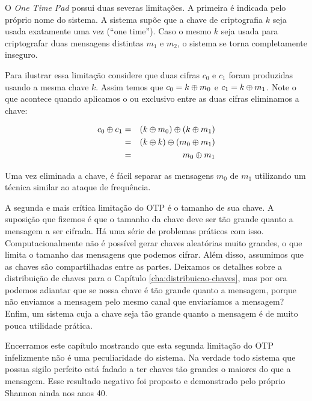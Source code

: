 O {\em One Time Pad} possui duas severas limitações.
A primeira é indicada pelo próprio nome do sistema.
A sistema supõe que a chave de criptografia $k$ seja usada exatamente uma vez (``one time'').
Caso o mesmo $k$ seja usada para criptografar duas mensagens distintas $m_1$ e $m_2$, o sistema se torna completamente inseguro.

Para ilustrar essa limitação considere que duas cifras $c_0$ e $c_1$ foram produzidas usando a mesma chave $k$.
Assim temos que $c_0 = k \oplus m_0$ e $c_1 = k \oplus m_1$.
Note o que acontece quando aplicamos o ou exclusivo entre as duas cifras eliminamos a chave:


\begin{eqnarray*}
  c_0 \oplus c_1 & = & (k \oplus m_0) \oplus (k \oplus m_1)\\
              & = & (k \oplus k) \oplus (m_0 \oplus m_1)\\
              & = & m_0 \oplus m_1
\end{eqnarray*}

Uma vez eliminada a chave, é fácil separar as mensagens $m_0$ de $m_1$ utilizando um técnica similar ao ataque de frequência.

A segunda e mais crítica limitação do OTP é o tamanho de sua chave.
A suposição que fizemos é que o tamanho da chave deve ser tão grande quanto a mensagem a ser cifrada.
Há uma série de problemas práticos com isso.
Computacionalmente não é possível gerar chaves aleatórias muito grandes, o que limita o tamanho das mensagens que podemos cifrar.
Além disso, assumimos que as chaves são compartilhadas entre as partes.
Deixamos os detalhes sobre a distribuição de chaves para o Capítulo \ref{cha:distribuicao-chaves}, mas por ora podemos adiantar que se nossa chave é tão grande quanto a mensagem, porque não enviamos a mensagem pelo mesmo canal que enviaríamos a mensagem?
Enfim, um sistema cuja a chave seja tão grande quanto a mensagem é de muito pouca utilidade prática.

Encerramos este capítulo mostrando que esta segunda limitação do OTP infelizmente não é uma peculiaridade do sistema.
Na verdade todo sistema que possua sigilo perfeito está fadado a ter chaves tão grandes o maiores do que a mensagem.
Esse resultado negativo foi proposto e demonstrado pelo próprio Shannon ainda nos anos 40.


